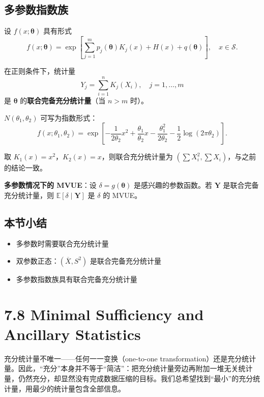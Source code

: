 \subsection{多参数指数族}

\begin{definition}[$m$ 参数指数族]\label{def:multi-exponential}
设 $f(x; \boldsymbol{\theta})$ 具有形式
\[
f(x; \boldsymbol{\theta}) = \exp\left[\sum_{j=1}^m p_j(\boldsymbol{\theta})K_j(x) + H(x) + q(\boldsymbol{\theta})\right],\quad x \in \mathcal{S}.
\]

在正则条件下，统计量
\[
Y_j = \sum_{i=1}^n K_j(X_i),\quad j = 1, \ldots, m
\]
是 $\boldsymbol{\theta}$ 的\textbf{联合完备充分统计量}（当 $n > m$ 时）。
\end{definition}

\begin{example}[双参数指数族]\label{ex:normal-exponential-two}
$N(\theta_1, \theta_2)$ 可写为指数形式：
\[
f(x; \theta_1, \theta_2) = \exp\left[-\frac{1}{2\theta_2}x^2 + \frac{\theta_1}{\theta_2}x - \frac{\theta_1^2}{2\theta_2} - \frac{1}{2}\log(2\pi\theta_2)\right].
\]

取 $K_1(x) = x^2$，$K_2(x) = x$，则联合充分统计量为 $(\sum X_i^2, \sum X_i)$，与之前的结论一致。
\end{example}

\textbf{多参数情况下的 MVUE}：设 $\delta = g(\boldsymbol{\theta})$ 是感兴趣的参数函数。若 $\mathbf{Y}$ 是联合完备充分统计量，则 $\mathbb{E}[\delta \mid \mathbf{Y}]$ 是 $\delta$ 的 MVUE。

\subsection*{本节小结}

\begin{itemize}
\item 多参数时需要联合充分统计量
\item 双参数正态：$(\overline{X}, S^2)$ 是联合完备充分统计量
\item 多参数指数族具有联合完备充分统计量
\end{itemize}

\section{7.8 Minimal Sufficiency and Ancillary Statistics}\label{sec:7.8}

充分统计量不唯一——任何一一变换（one-to-one transformation）还是充分统计量。因此，``充分''本身并不等于``简洁''：把充分统计量旁边再附加一堆无关统计量，仍然充分，却显然没有完成数据压缩的目标。我们总希望找到``最小''的充分统计量，用最少的统计量包含全部信息。

